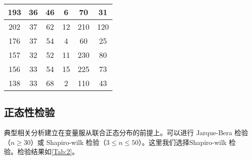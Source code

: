 \documentclass[withoutpreface]{cumcmthesis}
\begin{document}
\begin{table}[H]
\begin{tabular}{|c|c|c|c|c|c|}
        \hline
        \rowcolor[rgb]{ .867,  .922,  .969} 193              & 36               & 46               & \cellcolor[rgb]{ .886,  .937,  .855}6                    & \cellcolor[rgb]{ .886,  .937,  .855}70                 & \cellcolor[rgb]{ .886,  .937,  .855}31 \bigstrut                \\
        \hline
        \rowcolor[rgb]{ .867,  .922,  .969} 202              & 37               & 62               & \cellcolor[rgb]{ .886,  .937,  .855}12                   & \cellcolor[rgb]{ .886,  .937,  .855}210                & \cellcolor[rgb]{ .886,  .937,  .855}120 \bigstrut               \\
        \hline
        \rowcolor[rgb]{ .867,  .922,  .969} 176              & 37               & 54               & \cellcolor[rgb]{ .886,  .937,  .855}4                    & \cellcolor[rgb]{ .886,  .937,  .855}60                 & \cellcolor[rgb]{ .886,  .937,  .855}25 \bigstrut                \\
        \hline
        \rowcolor[rgb]{ .867,  .922,  .969} 157              & 32               & 52               & \cellcolor[rgb]{ .886,  .937,  .855}11                   & \cellcolor[rgb]{ .886,  .937,  .855}230                & \cellcolor[rgb]{ .886,  .937,  .855}80 \bigstrut                \\
        \hline
        \rowcolor[rgb]{ .867,  .922,  .969} 156              & 33               & 54               & \cellcolor[rgb]{ .886,  .937,  .855}15                   & \cellcolor[rgb]{ .886,  .937,  .855}225                & \cellcolor[rgb]{ .886,  .937,  .855}73 \bigstrut                \\
        \hline
        \rowcolor[rgb]{ .867,  .922,  .969} 138              & 33               & 68               & \cellcolor[rgb]{ .886,  .937,  .855}2                    & \cellcolor[rgb]{ .886,  .937,  .855}110                & \cellcolor[rgb]{ .886,  .937,  .855}43 \bigstrut                \\
        \hline
    \end{tabular}
\end{table}

\subsection{正态性检验}
典型相关分析建立在变量服从联合正态分布的前提上。可以进行 Jarque-Bera 检验（$n\ge 30$）或 Shapiro-wilk 检验（$3\le n \le 50$）。这里我们选择Shapiro-wilk 检验。检验结果如\cref{Tab:2}。
\end{document}
